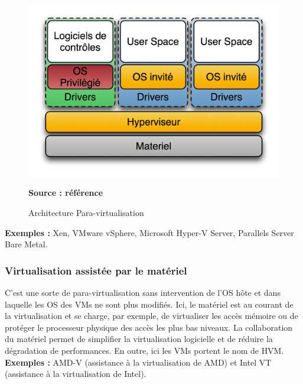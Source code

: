 \begin{figure}[H]
      \centering
      \includegraphics[scale=.8]{fig1/para_virtualisation.png}
      \caption{Architecture Para-virtualisation}
      \label{fig:para_virtualisation}
      \centering \bfseries Source : référence \cite{online2}
\end{figure}

\noindent \textbf{Exemples :} Xen, VMware vSphere,  Microsoft Hyper-V Server, Parallels Server Bare Metal.
    
\subsubsection{Virtualisation assistée par le matériel}
\label{subsubsection:hvm}
C'est une sorte de para-virtualisation sans intervention de l'OS hôte et dans laquelle les OS des VMs ne sont plus modifiés. Ici, le matériel est au courant de la virtualisation et se charge, par exemple, de virtualiser les accès mémoire ou de protéger le processeur physique des accès les plus bas niveaux. La collaboration du matériel permet de simplifier la virtualisation logicielle et de réduire la dégradation de performances. En outre, ici les VMs portent le nom de \ac{HVM}.
    \\ \textbf{Exemples :} AMD-V (assistance à la virtualisation de AMD) et Intel VT (assistance à la virtualisation de Intel).

